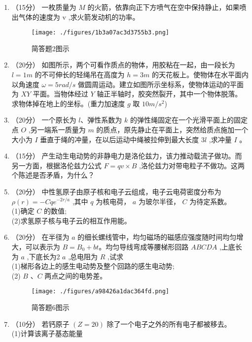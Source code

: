 

\begin{enumerate}
\item （15分）
一枚质量为 $M$ 的火箭，依靠向正下方喷气在空中保持静止，如果喷出气体的速度为  $\mathrm v$ ,求火箭发动机的功率。\\
\begin{figure}[ht]
\centering
\texttt{[image: ./figures/1b3a07ac3d3755b3.png]}
\caption{简答题2图示} \label{fig_USTC15_1}
\end{figure}
\item （20分）
如图所示，两个可看作质点的物体，用胶粘在一起，由一段长为 $l=1m$ 的不可伸长的轻绳吊在高度为 $h=3m$ 的天花板上。使物体在水平面内以角速度 $\omega=5rad/s$ 做圆周运动。建立如图所示坐标系，使物体运动的平面为 $XY$ 平面。当物体经过 $Y$ 轴正半轴时，胶突然裂开，其中一个物体脱落。求物体掉在地上的坐标。(重力加速度 $g$ 取 $10m/s^2$)
\item （20分）
一个原长为 $l$、弹性系数为 $k$ 的弹性绳固定在一个光滑平面上的固定点 $O$ ,另一端系一质量为 $m$ 的质点，原先静止在平面上，突然给质点施加一个大小为 $I$ 垂直于绳的冲量，在以后运动中绳被拉伸到最大长度 3$l$ ,求冲量 $I$ 。
\item （15分）
产生动生电动势的非静电力是洛伦兹力，该力推动载流子做功。而另一方面，根据洛伦兹力公式 $F=qv\times B$ ,洛伦兹力对带电粒子不做功。这两个陈述是否矛盾，为什么？
\item （20分）
中性氢原子由原子核和电子云组成，电子云电荷密度分布为 $\rho(r)=-Cqe^{-2r/a}$ ,其中 $q$ 为核电荷， $a$ 为玻尔半径， $C$ 为待定系数。\\
(1)确定 $C$ 的数值;\\
(2)求氢原子核与电子云的相互作用能。
\item （20分）
在半径为 $a$ 的细长螺线管中，均匀磁场的磁感应强度随时间均匀增大，可以表示为 $B=B_0+bt$。均匀导线弯成等腰梯形回路 $ABCDA$ ,上底长为 $a$ ,下底长为2 $a$ ,总电阻为 $R$ ,试求\\
(1)梯形各边上的感生电动势及整个回路的感生电动势;\\
(2) $B$ 、$C$ 两点之间的电势差。\\
\begin{figure}[ht]
\centering
\texttt{[image: ./figures/a98426a1dac364fd.png]}
\caption{简答题6图示} \label{fig_USTC15_2}
\end{figure}
\item （10分）
若钙原子 $(Z=20)$ 除了一个电子之外的所有电子都被移去。\\
(1)计算该离子基态能量\\

\end{enumerate}
